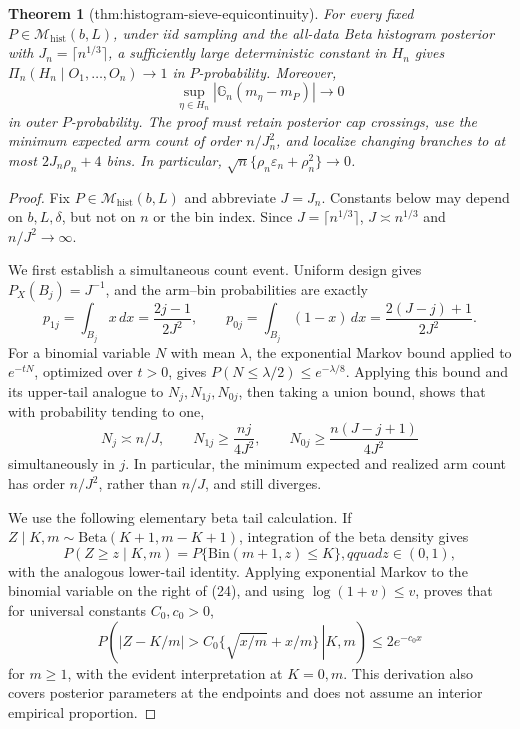 \documentclass{article}
\newtheorem{theorem}{Theorem}
\begin{document}
\begin{theorem}[thm:histogram-sieve-equicontinuity]\label{thm:histogram-sieve-equicontinuity}
For every fixed \(P\in\mathcal M_{\mathrm{hist}}(b,L)\), under iid sampling and the all-data Beta histogram posterior with \(J_n=\lceil n^{1/3}\rceil\), a sufficiently large deterministic constant in \(H_n\) gives \(\Pi_n(H_n\mid O_1,\ldots,O_n)\to1\) in \(P\)-probability. Moreover, \[\sup_{\eta\in H_n}|\mathbb G_n(m_\eta-m_P)|\to0\] in outer \(P\)-probability. The proof must retain posterior cap crossings, use the minimum expected arm count of order \(n/J_n^2\), and localize changing branches to at most \(2J_n\rho_n+4\) bins. In particular, \(\sqrt n\{\rho_n\varepsilon_n+\rho_n^2\}\to0\).
\end{theorem}
\begin{proof}
Fix \(P\in\mathcal M_{\mathrm{hist}}(b,L)\) and abbreviate \(J=J_n\).  Constants below may depend on \(b,L,\delta\), but not on \(n\) or the bin index.  Since \(J=\lceil n^{1/3}\rceil\), \(J\asymp n^{1/3}\) and \(n/J^2\to\infty\).

We first establish a simultaneous count event.  Uniform design gives \(P_X(B_j)=J^{-1}\), and the arm--bin probabilities are exactly
\begin{equation}
 p_{1j}=\int_{B_j}x\,dx=\frac{2j-1}{2J^2},\qquad
 p_{0j}=\int_{B_j}(1-x)\,dx=\frac{2(J-j)+1}{2J^2}.                                      \tag{22}
\end{equation}
For a binomial variable \(N\) with mean \(\lambda\), the exponential Markov bound applied to \(e^{-tN}\), optimized over \(t>0\), gives
\(P(N\le\lambda/2)\le e^{-\lambda/8}\).  Applying this bound and its upper-tail analogue to \(N_j,N_{1j},N_{0j}\), then taking a union bound, shows that with probability tending to one,
\begin{equation}
 N_j\asymp n/J,\qquad
 N_{1j}\ge \frac{nj}{4J^2},\qquad
 N_{0j}\ge\frac{n(J-j+1)}{4J^2}                                                         \tag{23}
\end{equation}
simultaneously in \(j\).  In particular, the minimum expected and realized arm count has order \(n/J^2\), rather than \(n/J\), and still diverges.

We use the following elementary beta tail calculation.  If \(Z\mid K,m\sim\mathrm{Beta}(K+1,m-K+1)\), integration of the beta density gives
\begin{equation}
 P(Z\ge z\mid K,m)=P\{\mathrm{Bin}(m+1,z)\le K\},qquad z\in(0,1),                     \tag{24}
\end{equation}
with the analogous lower-tail identity.  Applying exponential Markov to the binomial variable on the right of (24), and using
\(\log(1+v)\le v\), proves that for universal constants \(C_0,c_0>0\),
\begin{equation}
 P\!\left(\left.|Z-K/m|>C_0\{\sqrt{x/m}+x/m\}\,\right|K,m\right)
 \le 2e^{-c_0x}                                                                          \tag{25}
\end{equation}
for \(m\ge1\), with the evident interpretation at \(K=0,m\).  This derivation also covers posterior parameters at the endpoints and does not assume an interior empirical proportion.


\end{proof}
\end{document}
